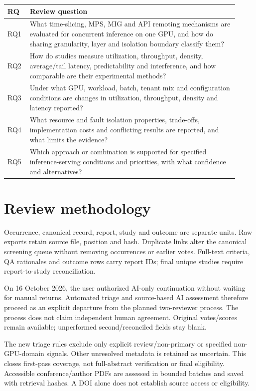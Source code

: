 \documentclass[12pt,a4paper]{article}
\begin{document}
{\small\begin{longtable}{>{\raggedright\arraybackslash}p{0.08\linewidth}>{\raggedright\arraybackslash}p{0.84\linewidth}}
\toprule
RQ & Review question\\\midrule
\endhead
RQ1 & What time-slicing, MPS, MIG and API remoting mechanisms are evaluated for concurrent inference on one GPU, and how do sharing granularity, layer and isolation boundary classify them?\\
RQ2 & How do studies measure utilization, throughput, density, average/\allowbreak{}tail latency, predictability and interference, and how comparable are their experimental methods?\\
RQ3 & Under what GPU, workload, batch, tenant mix and configuration conditions are changes in utilization, throughput, density and latency reported?\\
RQ4 & What resource and fault isolation properties, trade-offs, implementation costs and conflicting results are reported, and what limits the evidence?\\
RQ5 & Which approach or combination is supported for specified inference-serving conditions and priorities, with what confidence and alternatives?\\
\bottomrule
\end{longtable}}


\section{Review methodology}

Occurrence, canonical record, report, study and outcome are separate units. Raw exports retain source file, position and hash. Duplicate links alter the canonical screening queue without removing occurrences or earlier votes. Full-text criteria, QA rationales and outcome rows carry report IDs; final unique studies require report-to-study reconciliation.


On 16 October 2026, the user authorized AI-only continuation without waiting for manual returns. Automated triage and source-based AI assessment therefore proceed as an explicit departure from the planned two-reviewer process. The process does not claim independent human agreement. Original votes/\allowbreak{}scores remain available; unperformed second/\allowbreak{}reconciled fields stay blank.


The new triage rules exclude only explicit review/\allowbreak{}non-primary or specified non-GPU-domain signals. Other unresolved metadata is retained as uncertain. This closes first-pass coverage, not full-abstract verification or final eligibility. Accessible conference/\allowbreak{}author PDFs are assessed in bounded batches and saved with retrieval hashes. A DOI alone does not establish source access or eligibility.
\end{document}
